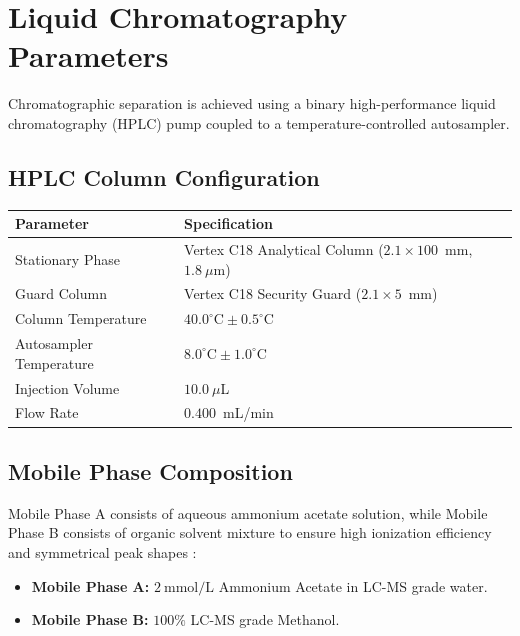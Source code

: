 \section{Liquid Chromatography Parameters}
Chromatographic separation is achieved using a binary high-performance liquid chromatography (HPLC) pump coupled to a temperature-controlled autosampler.

\subsection{HPLC Column Configuration}
\begin{tabularx}{\textwidth}{p{4.5cm} X}
    \toprule
    \textbf{Parameter} & \textbf{Specification} \\
    \midrule
    Stationary Phase & Vertex C18 Analytical Column ($2.1 \times 100$~mm, $1.8~\mu$m) \\
    Guard Column & Vertex C18 Security Guard ($2.1 \times 5$~mm) \\
    Column Temperature & $40.0^\circ\text{C} \pm 0.5^\circ\text{C}$ \\
    Autosampler Temperature & $8.0^\circ\text{C} \pm 1.0^\circ\text{C}$ \\
    Injection Volume & $10.0~\mu$L \\
    Flow Rate & $0.400$~mL/min \\
    \bottomrule
\end{tabularx}

\subsection{Mobile Phase Composition}
Mobile Phase A consists of aqueous ammonium acetate solution, while Mobile Phase B consists of organic solvent mixture to ensure high ionization efficiency and symmetrical peak shapes \cite{smith2023high}:
\begin{itemize}
    \item \textbf{Mobile Phase A:} $2~\text{mmol/L}$ Ammonium Acetate in LC-MS grade water.
    \item \textbf{Mobile Phase B:} $100\%$ LC-MS grade Methanol.
\end{itemize}

